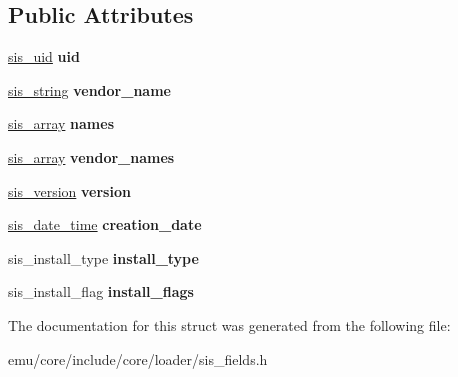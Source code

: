 \subsection*{Public Attributes}
\begin{DoxyCompactItemize}
\item 
\mbox{\label{structeka2l1_1_1loader_1_1sis__info_afa57992626a38b707ad0f7f8f1399a99}} 
\mbox{\hyperlink{structeka2l1_1_1loader_1_1sis__uid}{sis\+\_\+uid}} {\bfseries uid}
\item 
\mbox{\label{structeka2l1_1_1loader_1_1sis__info_a4276e496132482ec433070900400d48b}} 
\mbox{\hyperlink{structeka2l1_1_1loader_1_1sis__string}{sis\+\_\+string}} {\bfseries vendor\+\_\+name}
\item 
\mbox{\label{structeka2l1_1_1loader_1_1sis__info_a48141f2599c675100881a5d11d9c08a9}} 
\mbox{\hyperlink{structeka2l1_1_1loader_1_1sis__array}{sis\+\_\+array}} {\bfseries names}
\item 
\mbox{\label{structeka2l1_1_1loader_1_1sis__info_a81db072380f240c6c5f6896a2b35a8da}} 
\mbox{\hyperlink{structeka2l1_1_1loader_1_1sis__array}{sis\+\_\+array}} {\bfseries vendor\+\_\+names}
\item 
\mbox{\label{structeka2l1_1_1loader_1_1sis__info_acfb8e21c1a3aa63ae67a24c3cb97fc3a}} 
\mbox{\hyperlink{structeka2l1_1_1loader_1_1sis__version}{sis\+\_\+version}} {\bfseries version}
\item 
\mbox{\label{structeka2l1_1_1loader_1_1sis__info_a2d46e25d6282153628cb78c31df94d6d}} 
\mbox{\hyperlink{structeka2l1_1_1loader_1_1sis__date__time}{sis\+\_\+date\+\_\+time}} {\bfseries creation\+\_\+date}
\item 
\mbox{\label{structeka2l1_1_1loader_1_1sis__info_ad917958d61f99103e915549520be4acf}} 
sis\+\_\+install\+\_\+type {\bfseries install\+\_\+type}
\item 
\mbox{\label{structeka2l1_1_1loader_1_1sis__info_a176d0a2e8e0781a793c525969afb05d7}} 
sis\+\_\+install\+\_\+flag {\bfseries install\+\_\+flags}
\end{DoxyCompactItemize}


The documentation for this struct was generated from the following file\+:\begin{DoxyCompactItemize}
\item 
emu/core/include/core/loader/sis\+\_\+fields.\+h\end{DoxyCompactItemize}
